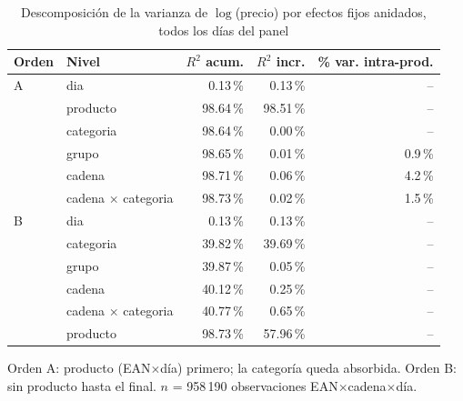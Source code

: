 \begin{table}[htbp]
\caption{Descomposici\'on de la varianza de $\log$(precio) por efectos fijos anidados, todos los d\'ias del panel}
\label{tab:varianza}
\centering\scriptsize\setlength{\tabcolsep}{3pt}
\begin{tabular}{@{}llrrr@{}}
\toprule
Orden & Nivel & $R^2$ acum. & $R^2$ incr. & \% var. intra-prod. \\
\midrule
A & dia & 0.13\,\% & 0.13\,\% & -- \\
 & producto & 98.64\,\% & 98.51\,\% & -- \\
 & categoria & 98.64\,\% & 0.00\,\% & -- \\
 & grupo & 98.65\,\% & 0.01\,\% & 0.9\,\% \\
 & cadena & 98.71\,\% & 0.06\,\% & 4.2\,\% \\
 & cadena $\times$ categoria & 98.73\,\% & 0.02\,\% & 1.5\,\% \\
\midrule
B & dia & 0.13\,\% & 0.13\,\% & -- \\
 & categoria & 39.82\,\% & 39.69\,\% & -- \\
 & grupo & 39.87\,\% & 0.05\,\% & -- \\
 & cadena & 40.12\,\% & 0.25\,\% & -- \\
 & cadena $\times$ categoria & 40.77\,\% & 0.65\,\% & -- \\
 & producto & 98.73\,\% & 57.96\,\% & -- \\
\bottomrule\end{tabular}
\par\smallskip\raggedright\scriptsize Orden A: producto (EAN$\times$d\'ia) primero; la categor\'ia queda absorbida. Orden B: sin producto hasta el final. $n$ = 958\,190 observaciones EAN$\times$cadena$\times$d\'ia.
\end{table}
